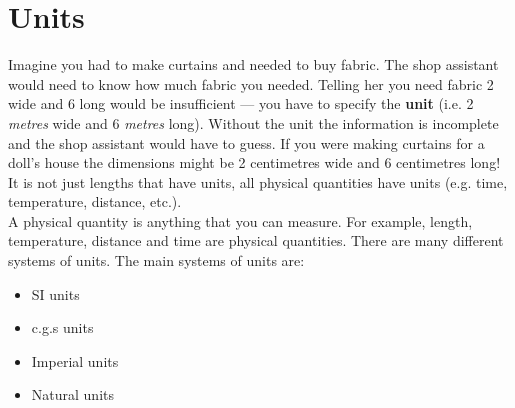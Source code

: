 \section{Units}
Imagine you had to make curtains and needed to buy fabric. The shop assistant would need to know how much fabric you needed. Telling her you need fabric 2 wide and 6 long would be insufficient --- you have to specify the \textbf{unit} (i.e.\@{} 2 \textsl{metres} wide and 6 \textsl{metres} long). Without the unit the information is incomplete and the shop assistant would have to guess. If you were making curtains for a doll's house the dimensions might be 2 centimetres wide and 6 centimetres long!\\ 
It is not just lengths that have units, all physical quantities have units (e.g.\@{} time, temperature, distance, etc.).\\
 { A physical quantity is anything that you can measure. For example, length, temperature, distance and time are physical quantities.} 
There are many different systems of units. The main systems of units are: 
\begin{itemize}
 \item SI units
\item c.g.s units
\item Imperial units
\item Natural units
\end{itemize}
